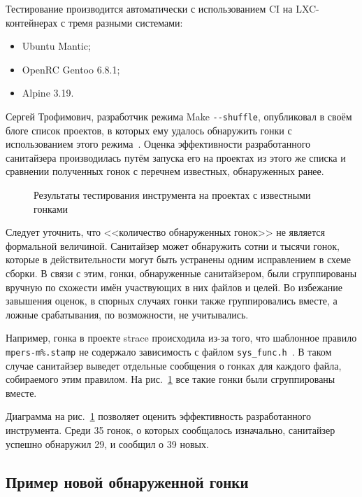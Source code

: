 Тестирование производится автоматически с использованием CI на LXC-контейнерах с тремя разными системами:

\begin{itemize}
    \item Ubuntu Mantic;
    \item OpenRC Gentoo 6.8.1;
    \item Alpine 3.19.
\end{itemize}

Сергей Трофимович, разработчик режима Make \texttt{-{}-shuffle}, опубликовал в своём блоге список проектов, в которых ему удалось обнаружить гонки с использованием этого режима~\cite{trofi-make-shuffle}. Оценка эффективности разработанного санитайзера производилась путём запуска его на проектах из этого же списка и сравнении полученных гонок с перечнем известных, обнаруженных ранее.

\begin{figure}[H]
    \centering
    
    \caption{Результаты тестирования инструмента на проектах с известными гонками}
    \label{fig:testing-results}
\end{figure}

Следует уточнить, что <<количество обнаруженных гонок>> не является формальной величиной. Санитайзер может обнаружить сотни и тысячи гонок, которые в действительности могут быть устранены одним исправлением в схеме сборки. В связи с этим, гонки, обнаруженные санитайзером, были сгруппированы вручную по схожести имён участвующих в них файлов и целей. Во избежание завышения оценок, в спорных случаях гонки также группировались вместе, а ложные срабатывания, по возможности, не учитывались.

Например, гонка в проекте strace происходила из-за того, что шаблонное правило \texttt{mpers-m\%.stamp} не содержало зависимость с файлом \texttt{sys\_func.h}~\cite{strace-race}. В таком случае санитайзер выведет отдельные сообщения о гонках для каждого файла, собираемого этим правилом. На рис.~\ref{fig:testing-results} все такие гонки были сгруппированы вместе.

Диаграмма на рис.~\ref{fig:testing-results} позволяет оценить эффективность разработанного инструмента. Среди 35 гонок, о которых сообщалось изначально, санитайзер успешно обнаружил 29, и сообщил о 39 новых.

\subsection{Пример новой обнаруженной гонки}

